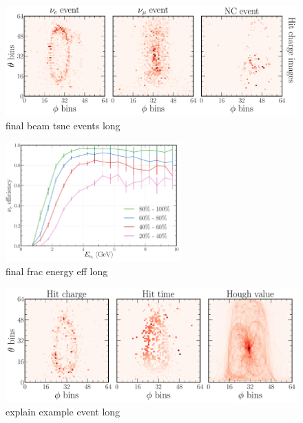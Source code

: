 \begin{figure} %
    \includegraphics[width=\textwidth]{diagrams/6-cvn/chipsnet/final_beam_tsne_events.pdf}
    \caption[final beam tsne events short]
    {final beam tsne events long}
    \label{fig:final_beam_tsne_events}
\end{figure}

\begin{figure} %
    \includegraphics[width=0.6\textwidth]{diagrams/6-cvn/chipsnet/final_frac_energy_eff.pdf}
    \caption[final frac energy eff short]
    {final frac energy eff long}
    \label{fig:final_frac_energy_eff}
\end{figure}

\begin{figure} %
    \includegraphics[width=\textwidth]{diagrams/6-cvn/chipsnet/explain_example_event.pdf}
    \caption[explain example event short]
    {explain example event long}
    \label{fig:explain_example_event}
\end{figure}

